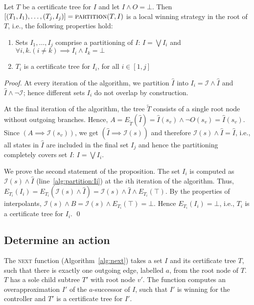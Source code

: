 \begin{proposition}\label{prop:partition}
    Let $T$ be a certificate tree for $I$ and let $I\land O =\bot$.  Then
    $[(T_1,I_1),\ldots,(T_j, I_j)] = \textsc{partition}(T, I)$
    is a local winning strategy in the root of $T$, i.e., the
    following properties hold:
    \begin{enumerate}
        \item Sets $I_1,\ldots,I_j$ comprise a partitioning of
            $I$: $I=\bigvee I_i$ and $\forall i, k. (i\neq k)
            \implies I_i\land I_k=\bot$
        \item $T_i$ is a certificate tree for $I_i$, for all
            $i\in[1,j]$
    \end{enumerate}
\end{proposition}
\begin{proof}
    At every iteration of the algorithm, we partition $\hat{I}$
    into $I_i = \mathcal{I} \land\hat{I}$ and
    $\hat{I} \land \neg\mathcal{I}$; hence different sets $I_i$ do
    not overlap by construction.

    At the final iteration of the algorithm, the tree $\tilde{T}$
    consists of a single root node without outgoing branches.
    Hence, $A = E_{\tilde{T}}(\hat{I}) = \hat{I}(s_v) \land \neg O(s_v) =
    \hat{I}(s_v)$.  Since $(A\implies \mathcal{I}(s_v))$, we get $(\hat{I} \implies \mathcal{I}(s))$
    and therefore $\mathcal{I}(s) \land \hat{I} = \hat{I}$, i.e., all
    states in $\hat{I}$ are included in the final set $I_j$ and hence
    the partitioning completely covers set $I$: $I=\bigvee I_i$.

    We prove the second statement of the proposition.  The set $I_i$ is computed as
    $\mathcal{I}(s) \land \hat{I}$ (line~\ref{alg:partition:Ii}) at the $i$th iteration of the algorithm.
    Thus, $E_{T_i}(I_i) = E_{T_i}(\mathcal{I}(s) \land \hat{I}) = \mathcal{I}(s) \land \hat{I} \land E_{T_i}(\top)$.
    By the properties of interpolants, $\mathcal{I}(s) \land B = \mathcal{I}(s) \land E_{T_i}(\top) = \bot$.
    Hence $E_{T_i}(I_i) = \bot$, i.e., $T_i$ is a certificate tree for $I_i$.
    \qed
\end{proof}

\subsection{Determine an action}

The \textsc{next} function (Algorithm~\ref{alg:next}) takes a set $I$ and its certificate tree $T$, such
that there is exactly one outgoing edge, labelled $a$, from the root node of $T$.
$T$ has a sole child subtree $T'$ with root node $v'$.
The function computes an overapproximation $I'$ of the $a$-successor of $I$,
such that $I'$ is winning for the controller and $T'$ is a certificate tree for $I'$.

